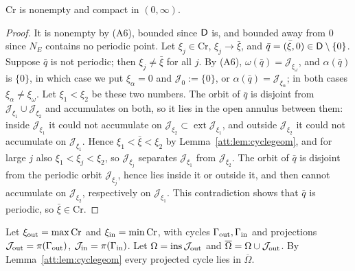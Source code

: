 \begin{lemma}\label{att:lem:crests}
$\mathrm{Cr}$ is nonempty and compact in $(0,\infty)$.
\end{lemma}
\begin{proof}
It is nonempty by (A6), bounded since $\mathsf D$ is, and bounded away from $0$ since $N_E$ contains no periodic point. Let $\xi_j\in\mathrm{Cr}$, $\xi_j\to\bar\xi$, and $\bar q=(\bar\xi,0)\in\mathsf D\setminus\{0\}$. Suppose $\bar q$ is not periodic; then $\xi_j\ne\bar\xi$ for all $j$. By (A6), $\omega(\bar q)=\mathcal J_{\xi_\omega}$, and $\alpha(\bar q)$ is $\{0\}$, in which case we put $\xi_\alpha=0$ and $\mathcal J_0:=\{0\}$, or $\alpha(\bar q)=\mathcal J_{\xi_\alpha}$; in both cases $\xi_\alpha\ne\xi_\omega$. Let $\xi_1<\xi_2$ be these two numbers. The orbit of $\bar q$ is disjoint from $\mathcal J_{\xi_1}\cup\mathcal J_{\xi_2}$ and accumulates on both, so it lies in the open annulus between them: inside $\mathcal J_{\xi_1}$ it could not accumulate on $\mathcal J_{\xi_2}\subset\operatorname{ext}\mathcal J_{\xi_1}$, and outside $\mathcal J_{\xi_2}$ it could not accumulate on $\mathcal J_{\xi_1}$. Hence $\xi_1<\bar\xi<\xi_2$ by Lemma~\ref{att:lem:cyclegeom}, and for large $j$ also $\xi_1<\xi_j<\xi_2$, so $\mathcal J_{\xi_j}$ separates $\mathcal J_{\xi_1}$ from $\mathcal J_{\xi_2}$. The orbit of $\bar q$ is disjoint from the periodic orbit $\mathcal J_{\xi_j}$, hence lies inside it or outside it, and then cannot accumulate on $\mathcal J_{\xi_2}$, respectively on $\mathcal J_{\xi_1}$. This contradiction shows that $\bar q$ is periodic, so $\bar\xi\in\mathrm{Cr}$.
\end{proof}
Let $\xi_{\rm out}=\max\mathrm{Cr}$ and $\xi_{\rm in}=\min\mathrm{Cr}$, with cycles $\Gamma_{\rm out},\Gamma_{\rm in}$ and projections $\mathcal J_{\rm out}=\pi(\Gamma_{\rm out})$, $\mathcal J_{\rm in}=\pi(\Gamma_{\rm in})$. Let $\Omega=\operatorname{ins}\mathcal J_{\rm out}$ and $\overline\Omega=\Omega\cup\mathcal J_{\rm out}$. By Lemma~\ref{att:lem:cyclegeom} every projected cycle lies in $\overline\Omega$.

